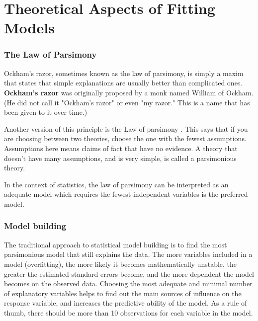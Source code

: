 


\section{Theoretical Aspects of Fitting Models}

\begin{frame}
\frametitle{The Law of Parsimony}
Ockham's razor, sometimes known as the law of parsimony, is simply a maxim that states that simple explanations are usually better than complicated ones. \textbf{Ockham's razor} was originally proposed by a monk named William of Ockham. (He did not call it "Ockham's razor" or even "my razor." This is a name that has been given to it over time.)
\end{frame}
\begin{frame}
Another version of this principle is the Law of parsimony . This says that if you are choosing between two theories, choose the one with the fewest assumptions. Assumptions here means claims of fact that have no evidence.
A theory that doesn't have many assumptions, and is very simple, is called a parsimonious theory.

In the context of statistics, the law of parsimony can be interpreted as an adequate model which requires the fewest independent variables is the preferred model.
\end{frame}
\begin{frame}
\frametitle{Model building}

The traditional approach to statistical model building is to find the most parsimonious model that still explains the data. The more variables included in a model (overfitting), the more likely it becomes mathematically unstable, the greater the estimated standard errors become, and the more dependent the model becomes on the observed data. Choosing the most adequate and minimal number of explanatory variables helps to find out the main sources of influence on the response variable, and increases the predictive ability of the model. As a rule of thumb, there should be more than 10 observations for each variable in the model.
%

\end{frame}
